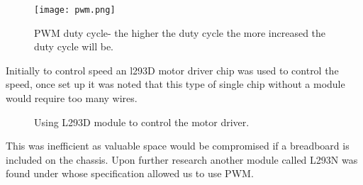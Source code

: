 \documentclass[11pt]{article}
\begin{document}
		\begin{center}
		\begin{figure}[H]
			\centering
			\texttt{[image: pwm.png]}
			\caption{PWM duty cycle- the higher the duty cycle the more increased the duty cycle will be.  }
			\label{fig:Flowchart}
		\end{figure}
	\end{center}

	Initially to control speed an l293D motor driver chip was used to control the speed, once set up it was noted that this type of single chip without a module would require too many wires.
	
\begin{center}
	\begin{figure}[H]
		\centering
		\qquad
		\caption{Using L293D module to control the motor driver.}
		\label{fig:Starting}
	\end{figure}
	
\end{center}



This was inefficient as valuable space would be compromised if a breadboard is included on the chassis. Upon further research another module called L293N was found under whose specification allowed us to use PWM.
\end{document}
